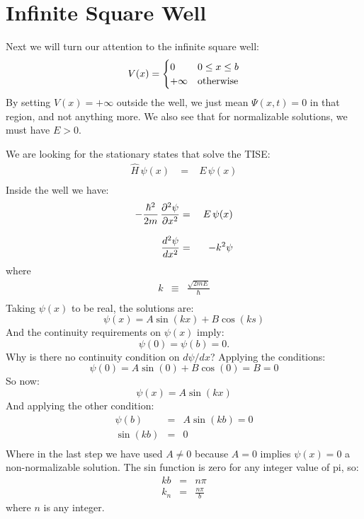 \documentclass[12pt]{book}
\begin{document}
\section{Infinite Square Well}

Next we will turn our attention to the infinite square well:
\begin{equation}
V(x) = 
\begin{cases}    
   0 & 0 \leq x \leq b \\
   +\infty & {\rm otherwise} \\
\end{cases}   
\end{equation}
By setting $V(x) = +\infty$ outside the well, we just mean $\Psi(x,t)=0$ in that region, and not anything more.  We also see that for normalizable solutions, we must have $E>0$.  

We are looking for the stationary states that solve the TISE:
\begin{eqnarray*}
\hat{H} \, \psi(x) \; &=& \; E \, \psi(x) \\
\end{eqnarray*}
Inside the well we have:
\begin{eqnarray*}
-\frac{\hbar^2}{2m}\,\frac{\partial^2\psi}{\partial x^2} &=& \; E \, \psi(x) \\[8pt]
 \frac{d^2 \psi}{dx^2}  &=& -k^2 \psi \\
\end{eqnarray*}
where
\begin{eqnarray*}
k &\equiv& \frac{\sqrt{2mE}}{\hbar} \\
\end{eqnarray*}
Taking $\psi(x)$ to be real, the solutions are:
\begin{equation*}
\psi(x) = A \sin(kx) + B \cos(ks)
\end{equation*}
And the continuity requirements on $\psi(x)$ imply:
\begin{equation*}
\psi(0) = \psi(b) = 0.
\end{equation*}
Why is there no continuity condition on $d\psi/dx$?  Applying the conditions:
\begin{equation*}
\psi(0) = A \sin(0) + B \cos(0) = B = 0
\end{equation*}
So now:
\begin{equation*}
\psi(x) = A \sin(kx) 
\end{equation*}
And applying the other condition:
\begin{eqnarray*}
\psi(b)  &=& A \sin(kb) = 0 \\
\sin(kb) &=& 0 \\
\end{eqnarray*}
Where in the last step we have used $A \neq 0$ because $A=0$ implies $\psi(x)=0$ a non-normalizable solution.  The sin function is zero for any integer value of pi, so:
\begin{eqnarray*}
kb &=& n \pi \\[12pt]
k_n&=&\frac{n\pi}{b}
\end{eqnarray*}
where $n$ is any integer.  
\end{document}
